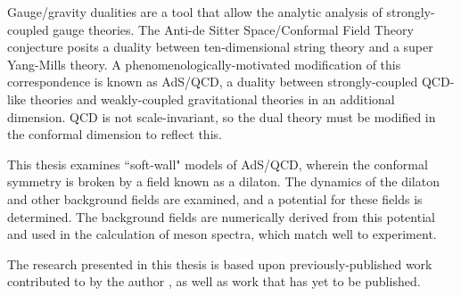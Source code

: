 

Gauge/gravity dualities are a tool that allow the analytic analysis of strongly-coupled gauge theories.
The Anti-de Sitter Space/Conformal Field Theory conjecture posits a duality between ten-dimensional string theory and a super Yang-Mills theory.
A phenomenologically-motivated modification of this correspondence is known as AdS/QCD, a duality between strongly-coupled QCD-like theories and weakly-coupled gravitational theories in an additional dimension.
QCD is not scale-invariant, so the dual theory must be modified in the conformal dimension to reflect this. 

This thesis examines ``soft-wall" models of AdS/QCD, wherein the conformal symmetry is broken by a field known as a dilaton.
The dynamics of the dilaton and other background fields are examined, and a potential for these fields is determined.
The background fields are numerically derived from this potential and used in the calculation of meson spectra, which match well to experiment.

The research presented in this thesis is based upon previously-published work contributed to by the author \cite{bartz-pions, Bartz2014}, as well as work that has yet to be published.